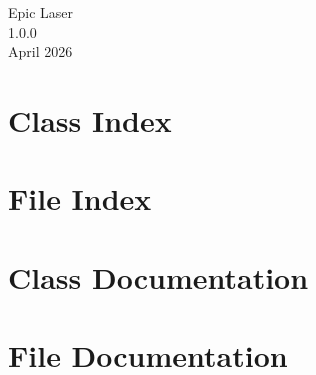 \documentclass[twoside]{book}
\newcommand{\+}{\discretionary{\mbox{\scriptsize$\hookleftarrow$}}{}{}}
\newcommand{\clearemptydoublepage}{%
    \newpage{\pagestyle{empty}\cleardoublepage}%
  }
\begin{document}
  \raggedbottom
    \hypersetup{pageanchor=false,
                bookmarksnumbered=true,
                pdfencoding=unicode
               }
  \begin{titlepage}
  \vspace*{7cm}
  \begin{center}%
  {\Large Epic Laser}\\
  [1ex]\large 1.\+0.\+0 \\
  \vspace*{1cm}
  {\large April 2026}\\
  \end{center}
  \end{titlepage}
  \clearemptydoublepage
  \tableofcontents
  \clearemptydoublepage
  \hypersetup{pageanchor=true}

\chapter{Class Index}

\chapter{File Index}

\chapter{Class Documentation}


\chapter{File Documentation}






  \backmatter
  \newpage
  \clearemptydoublepage
  \printindex
\end{document}
